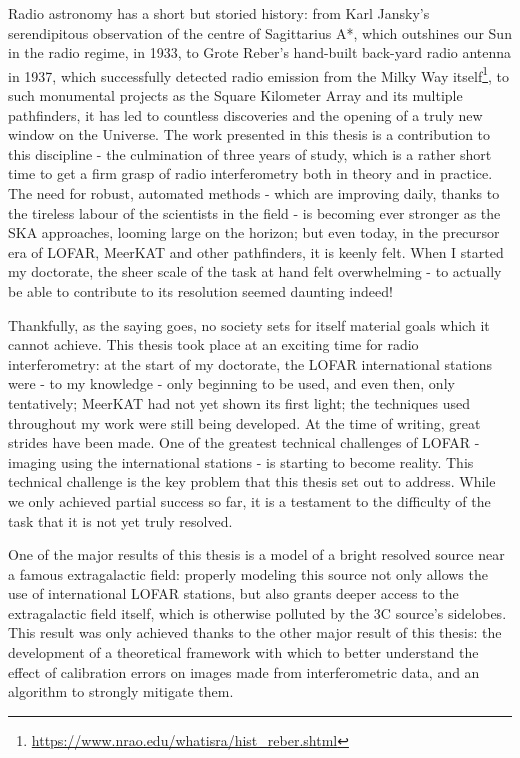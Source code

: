 \pg
Radio astronomy has a short but storied history: from Karl Jansky's serendipitous observation of the centre of Sagittarius A*, which outshines our Sun in the radio regime, in 1933, to Grote Reber's hand-built back-yard radio antenna in 1937, which successfully detected radio emission from the Milky Way itself\footnote{\url{https://www.nrao.edu/whatisra/hist_reber.shtml}}, to such monumental projects as the Square Kilometer Array and its multiple pathfinders, it has led to countless discoveries and the opening of a truly new window on the Universe. The work presented in this thesis is a contribution to this discipline - the culmination of three years of study, which is a rather short time to get a firm grasp of radio interferometry both in theory and in practice. The need for robust, automated methods - which are improving daily, thanks to the tireless labour of the scientists in the field - is becoming ever stronger as the SKA approaches, looming large on the horizon; but even today, in the precursor era of LOFAR, MeerKAT and other pathfinders, it is keenly felt. When I started my doctorate, the sheer scale of the task at hand felt overwhelming - to actually be able to contribute to its resolution seemed daunting indeed!

\pg
Thankfully, as the saying goes, no society sets for itself material goals which it cannot achieve. This thesis took place at an exciting time for radio interferometry: at the start of my doctorate, the LOFAR international stations were - to my knowledge - only beginning to be used, and even then, only tentatively; MeerKAT had not yet shown its first light; the techniques used throughout my work were still being developed. At the time of writing, great strides have been made. One of the greatest technical challenges of LOFAR - imaging using the international stations - is starting to become reality. This technical challenge is the key problem that this thesis set out to address. While we only achieved partial success so far, it is a testament to the difficulty of the task that it is not yet truly resolved.

\pg
One of the major results of this thesis is a model of a bright resolved source near a famous extragalactic field: properly modeling this source not only allows the use of international LOFAR stations, but also grants deeper access to the extragalactic field itself, which is otherwise polluted by the 3C source's sidelobes. This result was only achieved thanks to the other major result of this thesis: the development of a theoretical framework with which to better understand the effect of calibration errors on images made from interferometric data, and an algorithm to strongly mitigate them. 

